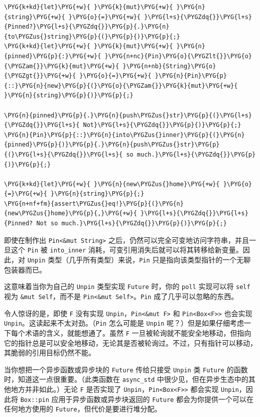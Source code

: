 \begin{Verbatim}[commandchars=\\\{\},breaklines=true,breakanywhere=true,fontsize=\codefont,xleftmargin=17bp]
\PYG{k+kd}{let}\PYG{+w}{ }\PYG{k}{mut}\PYG{+w}{ }\PYG{n}{string}\PYG{+w}{ }\PYG{o}{=}\PYG{+w}{ }\PYG{l+s}{\PYGZdq{}}\PYG{l+s}{Pinned?}\PYG{l+s}{\PYGZdq{}}\PYG{p}{.}\PYG{n}{to\PYGZus{}string}\PYG{p}{(}\PYG{p}{)}\PYG{p}{;}
\PYG{k+kd}{let}\PYG{+w}{ }\PYG{k}{mut}\PYG{+w}{ }\PYG{n}{pinned}\PYG{p}{:}\PYG{+w}{ }\PYG{n+nc}{Pin}\PYG{o}{\PYGZlt{}}\PYG{o}{\PYGZam{}}\PYG{k}{mut}\PYG{+w}{ }\PYG{n+nb}{String}\PYG{o}{\PYGZgt{}}\PYG{+w}{ }\PYG{o}{=}\PYG{+w}{ }\PYG{n}{Pin}\PYG{p}{::}\PYG{n}{new}\PYG{p}{(}\PYG{o}{\PYGZam{}}\PYG{k}{mut}\PYG{+w}{ }\PYG{n}{string}\PYG{p}{)}\PYG{p}{;}

\PYG{n}{pinned}\PYG{p}{.}\PYG{n}{push\PYGZus{}str}\PYG{p}{(}\PYG{l+s}{\PYGZdq{}}\PYG{l+s}{ Not}\PYG{l+s}{\PYGZdq{}}\PYG{p}{)}\PYG{p}{;}
\PYG{n}{Pin}\PYG{p}{::}\PYG{n}{into\PYGZus{}inner}\PYG{p}{(}\PYG{n}{pinned}\PYG{p}{)}\PYG{p}{.}\PYG{n}{push\PYGZus{}str}\PYG{p}{(}\PYG{l+s}{\PYGZdq{}}\PYG{l+s}{ so much.}\PYG{l+s}{\PYGZdq{}}\PYG{p}{)}\PYG{p}{;}

\PYG{k+kd}{let}\PYG{+w}{ }\PYG{n}{new\PYGZus{}home}\PYG{+w}{ }\PYG{o}{=}\PYG{+w}{ }\PYG{n}{string}\PYG{p}{;}
\PYG{n+nf+fm}{assert\PYGZus{}eq!}\PYG{p}{(}\PYG{n}{new\PYGZus{}home}\PYG{p}{,}\PYG{+w}{ }\PYG{l+s}{\PYGZdq{}}\PYG{l+s}{Pinned? Not so much.}\PYG{l+s}{\PYGZdq{}}\PYG{p}{)}\PYG{p}{;}
\end{Verbatim}

即使在制作出 \texttt{Pin<\&mut String>} 之后，仍然可以完全可变地访问字符串，并且一旦这个 \texttt{Pin} 被 \texttt{into\_inner} 消耗，可变引用消失后就可以将其转移给新变量。因此，对 \texttt{Unpin} 类型（几乎所有类型）来说，\texttt{Pin} 只是指向该类型指针的一个无聊包装器而已。

这意味着当你为自己的 \texttt{Unpin} 类型实现 \texttt{Future} 时，你的 \texttt{poll} 实现可以将 \texttt{self} 视为 \texttt{\&mut Self}，而不是 \texttt{Pin<\&mut Self>}。\texttt{Pin} 成了几乎可以忽略的东西。

令人惊讶的是，即使 \texttt{F} 没有实现 \texttt{Unpin}，\texttt{Pin<\&mut F>} 和 \texttt{Pin<Box<F>>} 也会实现 \texttt{Unpin}。这读起来不太对劲。（\texttt{Pin} 怎么可能是 \texttt{Unpin} 呢？）但是如果仔细考虑一下每个术语的含义，就能想通了。虽然 \texttt{F} 一旦被轮询就不能安全地移动，但指向它的指针总是可以安全地移动，无论其是否被轮询过。不过，只有指针可以移动，其脆弱的引用目标仍然不能。

当你想把一个异步函数或异步块的 \texttt{Future} 传给只接受 \texttt{Unpin} 类 \texttt{Future} 的函数时，知道这一点很重要。（此类函数在 \texttt{async\_std} 中很少见，但在异步生态中的其他地方并非如此。）无论 \texttt{F} 是否实现了 \texttt{Unpin}，\texttt{Pin<Box<F>>} 都会实现 \texttt{Unpin}，因此将 \texttt{Box::pin} 应用于异步函数或异步块返回的 \texttt{Future} 都会为你提供一个可以在任何地方使用的 \texttt{Future}，但代价是要进行堆分配。

